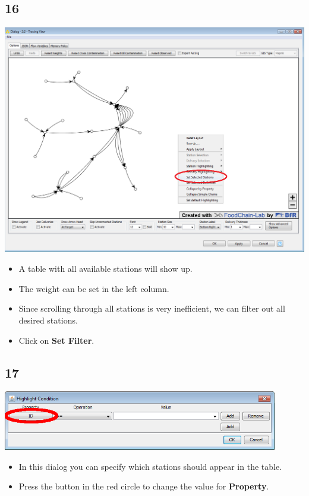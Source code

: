 \documentclass{beamer}
\begin{document}
\subsection{16}
\begin{frame}
	\begin{center}
  		\includegraphics[height=0.6\textheight]{16.png}
	\end{center}
	\begin{itemize}
		\item A table with all available stations will show up.
		\item The weight can be set in the left column.
		\item Since scrolling through all stations is very inefficient, we can filter out all desired stations.
		\item Click on \textbf{Set Filter}.
	\end{itemize}
\end{frame}

\subsection{17}
\begin{frame}
	\begin{center}
  		\includegraphics[width=0.9\textwidth]{17.png}
	\end{center}
	\begin{itemize}
		\item In this dialog you can specify which stations should appear in the table.
		\item Press the button in the red circle to change the value for \textbf{Property}.
	\end{itemize}
\end{frame}
\end{document}

